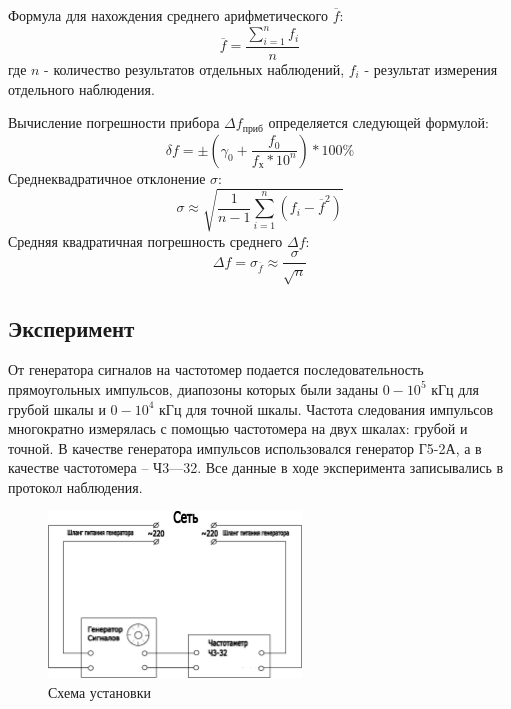Формула для нахождения среднего арифметического $\overline{f}$:
\begin{equation}
  \overline{f} = \frac{\sum_{i=1}^{n} f_i}{n}
\end{equation}
где $n$ - количество результатов отдельных наблюдений, $f_i$ - результат измерения отдельного наблюдения.

Вычисление погрешности прибора $\Delta f_{\text{приб}}$ определяется следующей формулой:
\begin{equation}
  \delta f = \pm ( \gamma_0 +  \frac{f_{\text{0}}}{f_{\text{х}}*10^n})* 100\%
\end{equation}
Среднеквадратичное отклонение $\sigma$:
\begin{equation}
  \sigma \approx \sqrt{\frac{1}{n-1} \sum_{i = 1}^{n} (f_i -\overline{f}^2)}
\end{equation}
Средняя квадратичная погрешность среднего $\Delta f$:
\begin{equation}
  \Delta f = \sigma_{\overline{f}} \approx \frac{\sigma}{\sqrt{n}}
\end{equation}

\subsection{Эксперимент}
От генератора сигналов на частотомер подается последовательность
прямоугольных импульсов, диапозоны которых были заданы $0-10^5$ кГц для грубой шкалы и $0-10^4$ кГц для точной шкалы.
Частота следования импульсов многократно измерялась с помощью частотомера на двух
шкалах: грубой и точной. В качестве генератора импульсов использовался
генератор Г5-2А, а в качестве частотомера – Ч3—32. Все данные в ходе эксперимента записывались в протокол наблюдения. \\

\begin{figure}[H]
\centering
\includegraphics[width=0.6\textwidth]{sketch1.eps}
\caption{Схема установки}
\label{fig:sketch}
\end{figure}


